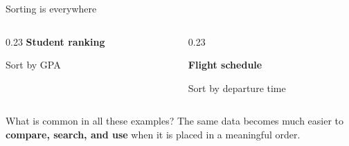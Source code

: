 \documentclass[aspectratio=169]{beamer}
\begin{document}
\begin{frame}{Sorting is everywhere}
\begin{columns}[T,onlytextwidth]
\begin{column}{0.23\textwidth}
\textbf{Student ranking}

\scriptsize
Sort by GPA
\end{column}

\begin{column}{0.23\textwidth}
\centering
{}

\textbf{Flight schedule}

\scriptsize
Sort by departure time
\end{column}

\end{columns}

\vspace{0.6em}

\begin{alertblock}{What is common in all these examples?}
The same data becomes much easier to \textbf{compare, search, and use}
when it is placed in a meaningful order.
\end{alertblock}

\end{frame}
\end{document}
